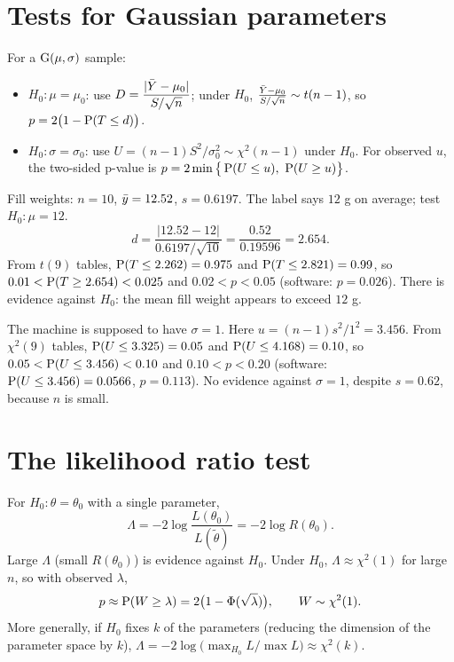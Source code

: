 \section{Tests for Gaussian parameters}

For a $\operatorname{G}(\mu,\sigma)$ sample:
\begin{itemize}
  \item $H_0:\mu=\mu_0$: use $D = \dfrac{|\bar{Y}-\mu_0|}{S/\sqrt n}$; under $H_0$,
        $\frac{\bar{Y}-\mu_0}{S/\sqrt n}\sim t(n-1)$, so $p = 2\big(1-\operatorname{P}(T\le d)\big)$.
  \item $H_0:\sigma=\sigma_0$: use $U = (n-1)S^2/\sigma_0^2\sim\chi^2(n-1)$ under $H_0$.
        For observed $u$, the two-sided p-value is
        $p = 2\min\big\{\operatorname{P}(U\le u),\ \operatorname{P}(U\ge u)\big\}$.
\end{itemize}

\begin{example}
Fill weights: $n=10$, $\bar{y}=12.52$, $s=0.6197$. The label says $12$ g on average; test
$H_0:\mu = 12$.
\[
d = \frac{|12.52-12|}{0.6197/\sqrt{10}} = \frac{0.52}{0.19596} = 2.654.
\]
From $t(9)$ tables, $\operatorname{P}(T\le 2.262) = 0.975$ and $\operatorname{P}(T\le 2.821) = 0.99$, so
$0.01 < \operatorname{P}(T\ge 2.654) < 0.025$ and $0.02<p<0.05$ (software: $p=0.026$). There is
evidence against $H_0$: the mean fill weight appears to exceed $12$ g.
\end{example}

\begin{example}
The machine is supposed to have $\sigma = 1$. Here $u = (n-1)s^2/1^2 = 3.456$. From
$\chi^2(9)$ tables, $\operatorname{P}(U\le 3.325) = 0.05$ and $\operatorname{P}(U\le 4.168) = 0.10$, so
$0.05<\operatorname{P}(U\le 3.456)<0.10$ and $0.10 < p < 0.20$ (software: $\operatorname{P}(U\le3.456) =
0.0566$, $p = 0.113$). No evidence against $\sigma=1$, despite $s=0.62$, because $n$ is
small.
\end{example}

\section{The likelihood ratio test}

\begin{definition}
For $H_0:\theta=\theta_0$ with a single parameter,
\[
\Lambda = -2\log\frac{L(\theta_0)}{L(\tilde\theta)} = -2\log R(\theta_0).
\]
Large $\Lambda$ (small $R(\theta_0)$) is evidence against $H_0$. Under $H_0$,
$\Lambda\approx\chi^2(1)$ for large $n$, so with observed $\lambda$,
\[
p\approx\operatorname{P}(W\ge\lambda) = 2\big(1-\Phi(\sqrt\lambda)\big),\qquad W\sim\chi^2(1).
\]
More generally, if $H_0$ fixes $k$ of the parameters (reducing the dimension of the
parameter space by $k$), $\Lambda = -2\log\big(\max_{H_0}L/\max L\big)\approx\chi^2(k)$.
\end{definition}

